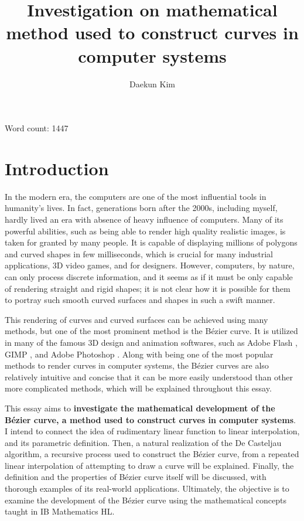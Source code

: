 \documentclass[11pt, oneside]{article}
\title{Investigation on mathematical method used to construct curves in computer systems}
\author{Daekun Kim}
\theoremstyle{definition}
\numberwithin{figure}{section}
\begin{document}
\begin{titlingpage}
\maketitle
Word count: 1447
\end{titlingpage}
\tableofcontents
\newpage

\section{Introduction}
In the modern era, the computers are one of the most influential tools in humanity's lives. In fact, generations born after the 2000s, including myself, hardly lived an era with absence of heavy influence of computers. Many of its powerful abilities, such as being able to render high quality realistic images, is taken for granted by many people. It is capable of displaying millions of polygons and curved shapes in few milliseconds, which is crucial for many industrial applications, 3D video games, and for designers. However, computers, by nature, can only process discrete information, and it seems as if it must be only capable  of rendering straight and rigid shapes; it is not clear how it is possible for them to portray such smooth curved surfaces and shapes in such a swift manner.

This rendering of curves and curved surfaces can be achieved using many methods, but one of the most prominent method is the B\'ezier curve. It is utilized in many of the famous 3D design and animation softwares, such as Adobe Flash , GIMP , and Adobe Photoshop . Along with being one of the most popular methods to render curves in computer systems, the B\'ezier curves are also relatively intuitive and concise that it can be more easily understood than other more complicated methods, which will be explained throughout this essay.

This essay aims to \textbf{investigate the mathematical development of the B\'ezier curve, a method used to construct curves in computer systems}. I intend to connect the idea of rudimentary linear function to linear interpolation, and its parametric definition. Then, a natural realization of the De Casteljau algorithm, a recursive process used to construct the B\'ezier curve, from a repeated linear interpolation of attempting to draw a curve will be explained. Finally, the definition and the properties of B\'ezier curve itself will be discussed, with thorough examples of its real-world applications. Ultimately, the objective is to examine the development of the B\'ezier curve using the mathematical concepts taught in IB Mathematics HL.
\end{document}
